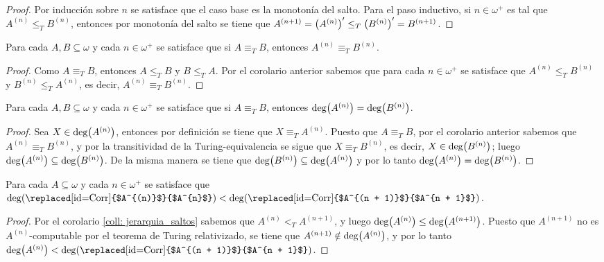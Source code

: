 \begin{agregado}
\begin{agregado}
\begin{proof}
	Por inducción sobre $n$ se satisface que el caso base es la monotonía del salto. Para el paso inductivo, si $n\in\omega^{+}$ es tal que $A^{(n)}\leq_{T} B^{(n)}$, entonces por monotonía del salto se tiene que $A^{(n + 1)} =\pa*{A^{(n)}}'\leq_{T}\pa*{B^{(n)}}' = B^{(n + 1)}$.
\end{proof}

\begin{coll}
	\label{coll: invarianza_saltos_iterados}
	Para cada $A, B\subseteq\omega$ y cada $n\in\omega^{+}$ se satisface que si $A\equiv_{T} B$, entonces $A^{(n)}\equiv_{T} B^{(n)}$.
\end{coll}

\begin{proof}
	Como $A\equiv_{T} B$, entonces $A\leq_{T} B$ y $B\leq_{T} A$. Por el corolario anterior sabemos que para cada $n\in\omega^{+}$ se satisface que $A^{(n)}\leq_{T} B^{(n)}$ y $B^{(n)}\leq_{T} A^{(n)}$, es decir, $A^{(n)}\equiv_{T} B^{(n)}$.
\end{proof}

\begin{coll}
	\label{coll: grados_saltos_iterados}
	Para cada $A, B\subseteq\omega$ y cada $n\in\omega^{+}$ se satisface que si $A\equiv_{T} B$, entonces $\GRADO{A^{(n)}} =\GRADO{B^{(n)}}$.
\end{coll}

\begin{proof}
	Sea $X\in\GRADO{A^{(n)}}$, entonces por definición se tiene que $X\equiv_{T} A^{(n)}$. Puesto que $A\equiv_{T} B$, por el corolario anterior sabemos que $A^{(n)}\equiv_{T} B^{(n)}$, y por la transitividad de la Turing-equivalencia se sigue que $X\equiv_{T} B^{(n)}$, es decir, $X\in\GRADO{B^{(n)}}$; luego $\GRADO{A^{(n)}}\subseteq\GRADO{B^{(n)}}$. De la misma manera se tiene que $\GRADO{B^{(n)}}\subseteq\GRADO{A^{(n)}}$ y por lo tanto $\GRADO{A^{(n)}} =\GRADO{B^{(n)}}$.
\end{proof}

\begin{coll}
	\label{coll: jerarquia_grados}
	Para cada $A\subseteq\omega$ y cada $n\in\omega^{+}$ se satisface que $\GRADO{\mbox{\replaced[id=Corr]{$A^{(n)}$}{$A^{n}$}}} <\GRADO{\mbox{\replaced[id=Corr]{$A^{(n + 1)}$}{$A^{n + 1}$}}}$.
\end{coll}

\begin{proof}
	Por el corolario \ref{coll: jerarquia_saltos} sabemos que $A^{(n)} <_{T} A^{(n + 1)}$, y luego $\GRADO{A^{(n)}}\leq\GRADO{A^{(n + 1)}}$. Puesto que $A^{(n + 1)}$ no es $A^{(n)}$-computable por el teorema de Turing relativizado, se tiene que $A^{(n + 1)}\notin\GRADO{A^{(n)}}$, y por lo tanto $\GRADO{A^{(n)}} <\GRADO{\mbox{\replaced[id=Corr]{$A^{(n + 1)}$}{$A^{n + 1}$}}}$.
\end{proof}
\end{agregado}


\end{agregado}
